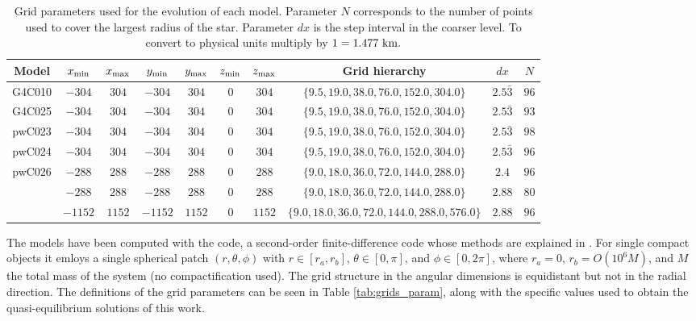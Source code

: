 \documentclass[twocolumn,superscriptaddress,showpacs,prd,aps,amsmath,amssymb,nofootinbib]{revtex4-1}
\newcommand{\GP}{\phi}
\newcommand{\GU}{\theta}
\begin{document}
\begin{table*}
\begin{tabular}{cccccccccc}
\hline
\hline
Model & $x_{\rm min}$ & $x_{\rm max}$ & $y_{\rm min}$ & $y_{\rm max}$ & $z_{\rm min}$ & $z_{\rm max}$ & 
Grid hierarchy & $dx$ & $N$  \\  
\hline
G4C010 & $-304$ & $304$ &  $-304$ &  $304$ &  $0$ &  $304$ & $\{9.5,19.0,38.0,76.0,152.0,304.0\}$ & $2.5\bar{3}$ & $96$  \\  
G4C025 & $-304$ & $304$ &  $-304$ &  $304$ &  $0$ &  $304$ & $\{9.5,19.0,38.0,76.0,152.0,304.0\}$ & $2.5\bar{3}$ & $93$  \\  
pwC023 & $-304$ & $304$ &  $-304$ &  $304$ &  $0$ &  $304$ & $\{9.5,19.0,38.0,76.0,152.0,304.0\}$ & $2.5\bar{3}$ & $98$  \\  
pwC024 & $-304$ & $304$ &  $-304$ &  $304$ &  $0$ &  $304$ & $\{9.5,19.0,38.0,76.0,152.0,304.0\}$ & $2.5\bar{3}$ & $96$  \\  
pwC026 & $-288$ & $288$ &  $-288$ &  $288$ &  $0$ &  $288$ & $\{9.0,18.0,36.0,72.0,144.0,288.0\}$ & $2.4$        & $96$  \\  
       & $-288$ & $288$ &  $-288$ &  $288$ &  $0$ &  $288$ & $\{9.0,18.0,36.0,72.0,144.0,288.0\}$ & $2.88$       & $80$  \\  
       & $-1152$& $1152$&  $-1152$&  $1152$&  $0$ &  $1152$& $\{9.0,18.0,36.0,72.0,144.0,288.0,576.0\}$ & $2.88$ & $96$  \\  
\hline
\hline
\end{tabular}
\caption{Grid parameters used for the evolution of each
model. Parameter $N$ corresponds to the number of points used to
cover the largest radius of the star. Parameter $dx$ is the step interval in the coarser
level. To convert to physical units multiply by $1=1.477\ {\rm km}.$}
\label{tab:evol_param}
\end{table*}

The models have been computed with the \cocal{} code, a second-order
finite-difference code whose methods are explained in
\cite{UT12,UTG12,TU13,TU15,TMGRU16}. For single compact objects it
emloys a single spherical patch $(r,\GU,\GP)$ with $r\in[r_a,r_b]$,
$\GU\in[0,\pi]$, and $\GP\in[0,2\pi]$, where $r_a=0$, $r_b=O(10^6 M)$,
and $M$ the total mass of the system (no compactification used).  The
grid structure in the angular dimensions is equidistant but not in the
radial direction.  The definitions of the grid parameters can be seen
in Table \ref{tab:grids_param}, along with the specific values used to
obtain the quasi-equilibrium solutions of this work.
\end{document}
